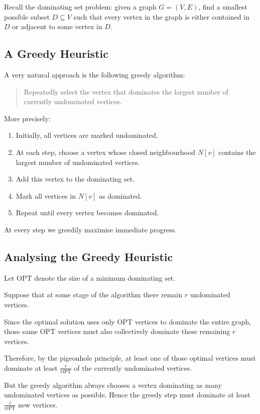 \documentclass[11pt,openany]{book}
\begin{document}
Recall the dominating set problem: given a graph \(G=(V,E)\), find a smallest possible subset \(D\subseteq V\) such that every vertex in the graph is either contained in \(D\) or adjacent to some vertex in \(D\).
\subsection*{A Greedy Heuristic}

A very natural approach is the following greedy algorithm:

\begin{quote}
Repeatedly select the vertex that dominates the largest number of currently undominated vertices.
\end{quote}

More precisely:
\begin{enumerate}
    \item Initially, all vertices are marked undominated.
    \item At each step, choose a vertex whose closed neighbourhood \(N[v]\) contains the largest number of undominated vertices.
    \item Add this vertex to the dominating set.
    \item Mark all vertices in \(N[v]\) as dominated.
    \item Repeat until every vertex becomes dominated.
\end{enumerate}

At every step we greedily maximise immediate progress.

\subsection*{Analysing the Greedy Heuristic}
Let \(\mathrm{OPT}\) denote the size of a minimum dominating set.

Suppose that at some stage of the algorithm there remain \(r\) undominated vertices.

Since the optimal solution uses only \(\mathrm{OPT}\) vertices to dominate the entire graph, those same \(\mathrm{OPT}\) vertices must also collectively dominate these remaining \(r\) vertices.

Therefore, by the pigeonhole principle, at least one of those optimal vertices must dominate at least \(\frac{r}{\mathrm{OPT}}\) of the currently undominated vertices.

But the greedy algorithm always chooses a vertex dominating as many undominated vertices as possible. Hence the greedy step must dominate at least \(\frac{r}{\mathrm{OPT}}\) new vertices.
\end{document}
